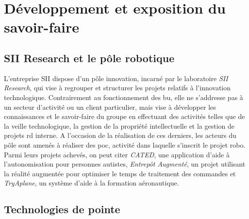 {	\section{Développement et exposition du savoir-faire}
	
		\subsection{SII Research et le pôle robotique}
			
			\par
			{
				L'entreprise SII dispose d'un pôle innovation, incarné par le laboratoire \emph{SII Research}, qui vise à regrouper et structurer les projets relatifs à l'innovation technologique. Contrairement au fonctionnement des \gls{bu}, elle ne s'addresse pas à un secteur d'activité ou un client particulier, mais vise à développer les connaissances et le savoir-faire du groupe en effectuant des activités telles que de la veille technologique, la gestion de la propriété intellectuelle et la gestion de projets \gls{rd} interne. A l'occasion de la réalisation de ces derniers, les acteurs du pôle sont amenés à réaliser des \gls{poc}, activité dans laquelle s'inscrit le projet \gls{robo}. Parmi leurs projets achevés, on peut citer \emph{CATED}, une application d'aide à l'autonomisation pour personnes autistes, \emph{Entrepôt Augmenté}, un projet utilisant la réalité augmentée pour optimiser le temps de traitement des commandes et \emph{TryAplane}, un système d'aide à la formation aéronautique.
			}
			\par
			{
				
			}
			
		\subsection{Technologies de pointe}
		
			
}
